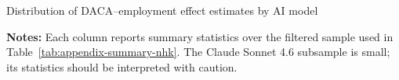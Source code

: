 \begin{table}[!htbp]
\centering
\caption{Distribution of DACA--employment effect estimates by AI model}
\label{tab:models}
\small

\caption*{\textbf{Notes:} Each column reports summary statistics over the filtered sample used in Table~\ref{tab:appendix-summary-nhk}. The Claude Sonnet 4.6 subsample is small; its statistics should be interpreted with caution.}
\end{table}
\FloatBarrier